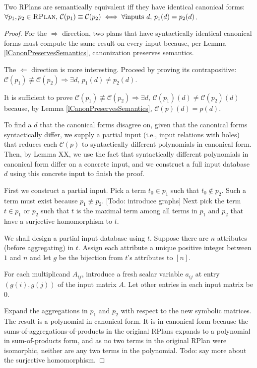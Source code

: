 \begin{theorem}
Two RPlans are semantically equivalent iff they have identical canonical forms:
$\forall p_1, p_2 \in \textsc{RPlan}{},\, \mathcal{C}(p_1) \equiv \mathcal{C}(p_2) \iff \forall \text{inputs }d,\, p_1(d) = p_2(d)$.
\end{theorem}
\begin{proof}
For the $\Rightarrow$ direction, two plans that have syntactically identical canonical forms must compute the same result on every input because, per Lemma \ref{lCanonPreservesSemantics}, canonization preserves semantics.

The $\Leftarrow$ direction is more interesting. Proceed by proving its contrapositive:
$\mathcal{C}(p_1) \not\equiv \mathcal{C}(p_2) \Rightarrow \exists d,\, p_1(d) \neq p_2(d)$.

It is sufficient to prove 
$\mathcal{C}(p_1) \not\equiv \mathcal{C}(p_2) \Rightarrow \exists d,\, \mathcal{C}(p_1)(d) \neq \mathcal{C}(p_2)(d)$
because, by Lemma \ref{lCanonPreservesSemantics}, $\mathcal{C}(p)(d) = p(d)$.

To find a $d$ that the canonical forms disagree on, given that the canonical forms syntactically differ,
we supply a partial input (i.e., input relations with holes) that reduces each $\mathcal{C}(p)$ to syntactically different polynomials in canonical form.
Then, by Lemma XX, we use the fact that syntactically different polynomials in canonical form differ on a concrete input, 
and we construct a full input database $d$ using this concrete input to finish the proof.

First we construct a partial input.
Pick a term $t_0 \in p_1$ such that $t_0 \not\in p_2$. Such a term must exist because $p_1 \not\equiv p_2$. [Todo: introduce graphs]
Next pick the term $t \in p_1 \text{ or } p_2$ such that $t$ is the maximal term among all terms in $p_1$ and $p_2$ that have a surjective homomorphism to $t$.

We shall design a partial input database using $t$.
Suppose there are $n$ attributes (before aggregating) in $t$.
Assign each attribute a unique positive integer between $1$ and $n$ and let $g$ be the bijection from $t$'s attributes to $[n]$.

For each multiplicand $A_{ij}$, introduce a fresh scalar variable $a_{ij}$ at entry $(g(i), g(j))$ of the input matrix $A$.
Let other entries in each input matrix be 0.

Expand the aggregations in $p_1$ and $p_2$ with respect to the new symbolic matrices.
The result is a polynomial in canonical form.
It is in canonical form because the sums-of-aggregations-of-products in the original RPlans expands to a polynomial in sum-of-products form,
and as no two terms in the original RPlan were isomorphic, neither are any two terms in the polynomial. Todo: say more about the surjective homomorphism.


\end{proof}
